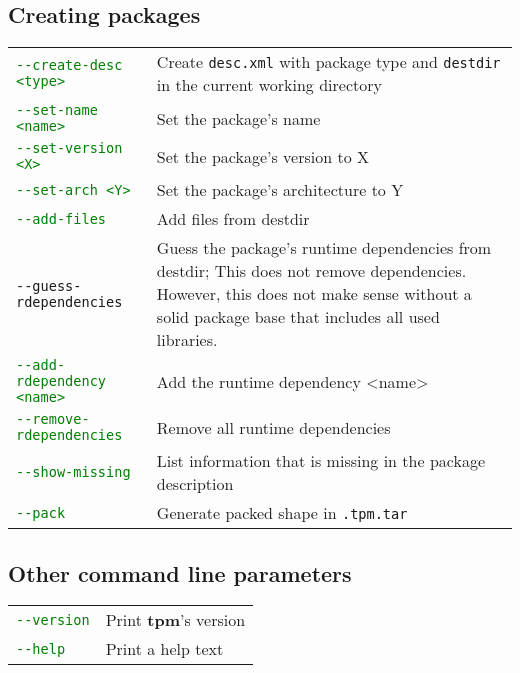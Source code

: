 \documentclass[a4paper]{article}
\newcommand{\file}[1]{\texttt{#1}}
\newcommand{\program}[1]{\textbf{#1}}
\newcommand{\green}[1]{\textcolor{green}{#1}}
\begin{document}
	\subsection{Creating packages}
	\label{sec:creating_packages}
	
	\bgroup
	\def\arraystretch{1.5}
	\begin{tabularx}{\textwidth}{lX}
		\green{\texttt{-{}-create-desc <type>}} & Create \file{desc.xml} with package type and \file{destdir} in the current working directory \\
		
		\green{\texttt{-{}-set-name <name>}} & Set the package's name \\
		
		\green{\texttt{-{}-set-version <X>}} & Set the package's version to X \\
		
		\green{\texttt{-{}-set-arch <Y>}} & Set the package's architecture to Y \\
		
		\green{\texttt{-{}-add-files}} & Add files from destdir \\
		
		\texttt{-{}-guess-rdependencies} & Guess the package's runtime dependencies from destdir; This does not remove dependencies. However, this does not make sense without a solid package base that includes all used libraries. \\
		
		\green{\texttt{-{}-add-rdependency <name>}} & Add the runtime dependency <name> \\
		
		\green{\texttt{-{}-remove-rdependencies}} & Remove all runtime dependencies \\
		
		\green{\texttt{-{}-show-missing}} & List information that is missing in the package description \\
		
		\green{\texttt{-{}-pack}} & Generate packed shape in \texttt{.tpm.tar}
	\end{tabularx}
	\egroup

	\subsection{Other command line parameters}
	\label{sec:other_command_line_parameters}
	
	\bgroup
	\def\arraystretch{1.5}
	\begin{tabularx}{\textwidth}{lX}
		\green{\texttt{-{}-version}} & Print \program{tpm}'s version \\
		\green{\texttt{-{}-help}} & Print a help text
	\end{tabularx}
	\egroup
	
\end{document}
